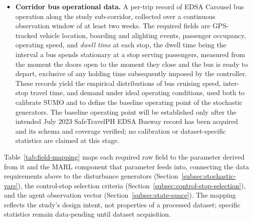 \iffalse
\begin{itemize}

\item \textbf{Corridor bus operational data.} A per-trip record of EDSA Carousel bus operation along the study sub-corridor, collected over a continuous observation window of at least two weeks. The required fields are GPS-tracked vehicle location, boarding and alighting events, passenger occupancy, operating speed, and \textit{dwell time} at each stop, the dwell time being the interval a bus spends stationary at a stop serving passengers, measured from the moment the doors open to the moment they close and the bus is ready to depart, exclusive of any holding time subsequently imposed by the controller. These records yield the empirical distributions of bus cruising speed, inter-stop travel time, and demand under ideal operating conditions, used both to calibrate SUMO and to define the baseline operating point of the stochastic generators. The baseline operating point will be established only after the intended July 2023 SafeTravelPH EDSA Busway record has been acquired and its schema and coverage verified; no calibration or dataset-specific statistics are claimed at this stage.


\end{itemize}

Table~\ref{tab:field-mapping} maps each required raw field to the parameter derived from it and the MARL component that parameter feeds into, connecting the data requirements above to the disturbance generators (Section~\ref{subsec:stochastic-vars}), the control-stop selection criteria (Section~\ref{subsec:control-stop-selection}), and the agent observation vector (Section~\ref{subsec:state-space}). The mapping reflects the study's design intent, not properties of a processed dataset; specific statistics remain data-pending until dataset acquisition.

